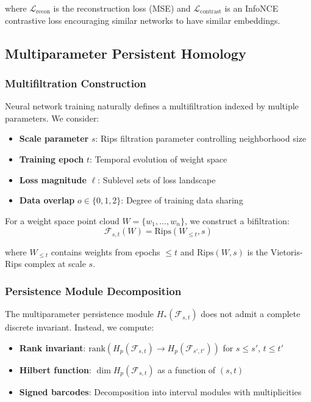 where $\mathcal{L}_{\text{recon}}$ is the reconstruction loss (MSE) and $\mathcal{L}_{\text{contrast}}$ is an InfoNCE contrastive loss encouraging similar networks to have similar embeddings.

\subsection{Multiparameter Persistent Homology}

\subsubsection{Multifiltration Construction}

Neural network training naturally defines a multifiltration indexed by multiple parameters. We consider:
\begin{itemize}
    \item \textbf{Scale parameter} $s$: Rips filtration parameter controlling neighborhood size
    \item \textbf{Training epoch} $t$: Temporal evolution of weight space
    \item \textbf{Loss magnitude} $\ell$: Sublevel sets of loss landscape
    \item \textbf{Data overlap} $o \in \{0, 1, 2\}$: Degree of training data sharing
\end{itemize}

For a weight space point cloud $W = \{w_1, \ldots, w_n\}$, we construct a bifiltration:
\begin{equation}
\mathcal{F}_{s,t}(W) = \text{Rips}(W_{\leq t}, s)
\label{eq:bifiltration}
\end{equation}

where $W_{\leq t}$ contains weights from epochs $\leq t$ and $\text{Rips}(W, s)$ is the Vietoris-Rips complex at scale $s$.

\subsubsection{Persistence Module Decomposition}

The multiparameter persistence module $H_*(\mathcal{F}_{s,t})$ does not admit a complete discrete invariant. Instead, we compute:
\begin{itemize}
    \item \textbf{Rank invariant}: $\text{rank}(H_p(\mathcal{F}_{s,t}) \to H_p(\mathcal{F}_{s',t'}))$ for $s \leq s'$, $t \leq t'$
    \item \textbf{Hilbert function}: $\dim H_p(\mathcal{F}_{s,t})$ as a function of $(s,t)$
    \item \textbf{Signed barcodes}: Decomposition into interval modules with multiplicities
\end{itemize}

